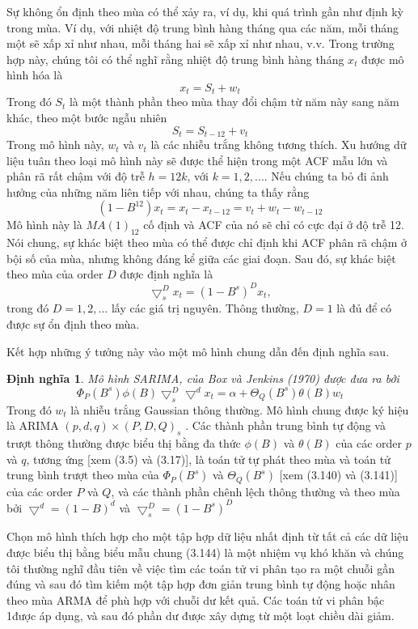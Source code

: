 \documentclass[12pt, a4paper,oneside]{book}
\theoremstyle{definition}
\newtheorem{dn}[theo]{Định nghĩa}
\begin{document}
Sự không ổn định theo mùa có thể xảy ra, ví dụ, khi quá trình gần như định kỳ trong mùa. Ví dụ, với nhiệt độ trung bình hàng tháng qua các năm, mỗi tháng một sẽ xấp xỉ như nhau, mỗi tháng hai sẽ xấp xỉ như nhau, v.v. Trong trường hợp này, chúng tôi có thể nghĩ rằng nhiệt độ trung bình hàng tháng $x_{t}$ được mô hình hóa là
$$x_{t}=S_{t} +w_{t}$$
Trong đó $S_{t}$ là một thành phần theo mùa thay đổi chậm từ năm này sang năm khác, theo một bước ngẫu nhiên
$$ S_{t}=S_{t-12}+ v_{t}$$
Trong mô hình này, $w_{t}$ và $v_{t}$ là các nhiễu trắng không tương thích. Xu hướng dữ liệu tuân theo loại mô hình này sẽ được thể hiện trong một ACF mẫu lớn và phân rã rất chậm với độ trễ $h = 12k$, với $k = 1, 2, ....$ Nếu chúng ta bỏ đi ảnh hưởng của những năm liên tiếp với nhau, chúng ta thấy rằng
$$(1-B^{12})x_{t}=x_{t}-x_{t-12}=v_{t}+w_{t}-w_{t-12}$$
Mô hình này là $MA(1)_{12}$ cố định và ACF của nó sẽ chỉ có cực đại ở độ trễ 12. Nói chung, sự khác biệt theo mùa có thể được chỉ định khi ACF phân rã chậm ở bội số của mùa, nhưng không đáng kể giữa các giai đoạn. Sau đó, sự khác biệt theo mùa của order $D$ được định nghĩa là
$$\bigtriangledown_{s}^{D}x_{t}=(1-B^{s})^{D}x_{t},$$
trong đó $D = 1, 2, ...$ lấy các giá trị nguyên. Thông thường, $D = 1$ là đủ để có được sự ổn định theo mùa.

Kết hợp những ý tưởng này vào một mô hình chung dẫn đến định nghĩa sau.
\begin{dn}	
	\textit{Mô hình SARIMA, của Box và Jenkins (1970) được đưa ra bởi} 
	$$\Phi_ {P} (B^{s})	\phi(B)\bigtriangledown_{s}^{D}\bigtriangledown^{d}x_{t}=\alpha + \varTheta_{Q}(B^{s})\theta(B)w_{t}$$
	Trong đó $w_{t}$ là nhiễu trắng Gaussian thông thường. Mô hình chung được ký hiệu là ARIMA $(p, d, q) \times (P, D, Q )_{s}$ . Các thành phần trung bình tự động và trượt thông thường được biểu thị bằng đa thức $\phi(B)$ và $\theta(B)$ của các order $p$ và $q$, tương ứng [xem (3.5) và (3.17)],
	là toán tử tự phát theo mùa và toán tử trung bình trượt theo mùa của $\Phi_ {P} (B^{s})$ và $\varTheta_{Q}(B^{s})$ [xem (3.140) và (3.141)] của các order $P$ và $Q$, và các thành phần chênh lệch thông thường và theo mùa bởi $\bigtriangledown^{d}=(1-B)^{d}$ và $\bigtriangledown^{D}_{s}=(1-B^{s})^{D}$
\end{dn}
Chọn mô hình thích hợp cho một tập hợp dữ liệu nhất định từ tất cả các dữ liệu được biểu thị bằng biểu mẫu chung (3.144) là một nhiệm vụ khó khăn và chúng tôi thường nghĩ đầu tiên về việc tìm các toán tử vi phân tạo ra một chuỗi gần đúng và sau đó tìm kiếm một tập hợp đơn giản trung bình tự động hoặc nhân theo mùa ARMA để phù hợp với chuỗi dư kết quả. Các toán tử vi phân bậc 1được áp dụng, và sau đó phần dư được xây dựng từ một loạt chiều dài giảm.
\end{document}
